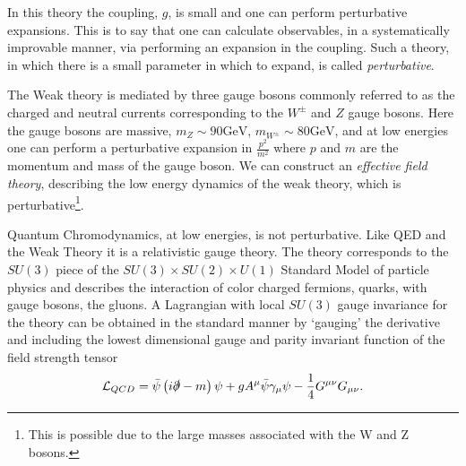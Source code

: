 In this theory the coupling, $g$, is small and one can perform perturbative expansions. This is to say that one can calculate observables, in a systematically improvable manner, via performing an expansion in the coupling. Such a theory, in which there is a small parameter in which to expand, is called \emph{perturbative}. 

The Weak theory is mediated by three gauge bosons commonly referred to as the charged and neutral currents corresponding to the $W^{\pm}$ and $Z$ gauge bosons. Here the gauge bosons are massive, $m_{Z} \sim 90 \mathrm{GeV}$, $m_{W^\pm} \sim 80 \mathrm{GeV}$, and at low energies one can perform a perturbative expansion in $\frac{p^2}{m^2}$ where $p$ and $m$ are the momentum and mass of the gauge boson. We can construct an \emph{effective field theory}, describing the low energy dynamics of the weak theory, which is perturbative\footnote{This is possible due to the large masses associated with the W and Z bosons. }. 

Quantum Chromodynamics, at low energies, is not perturbative. Like QED and the Weak Theory it is a relativistic gauge theory. The theory corresponds to the $SU(3)$ piece of the $SU(3)\times SU(2) \times U(1)$ Standard Model of particle physics and describes the interaction of color charged fermions, quarks, with gauge bosons, the gluons. A Lagrangian with local $SU(3)$ gauge invariance for the theory can be obtained in the standard manner by `gauging' the derivative and including the lowest dimensional gauge and parity invariant function of the field strength tensor
\begin{equation*}
\mathcal{L}_{QCD} = \bar{\psi} \left( i\slashed{\partial} - m \right) \psi +gA^\mu \bar{\psi} \gamma_\mu \psi - \frac{1}{4} G^{\mu\nu } G_{\mu\nu}.
\end{equation*}

